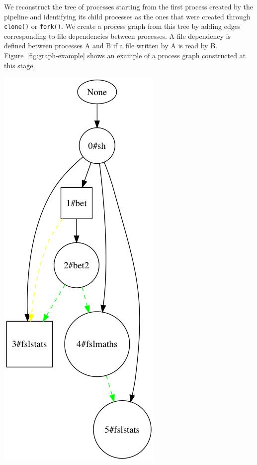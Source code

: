 \documentclass{article}
\begin{document}
We reconstruct the tree of processes starting from the first process
created by the pipeline and identifying its child processes as the ones
that were created through \texttt{clone()} or \texttt{fork()}. We
create a process graph from this tree by adding edges corresponding to
file dependencies between processes. A file dependency is defined
between processes A and B if a file written by A is read by
B. Figure~\ref{fig:graph-example} shows an example of a process graph
constructed at this stage.

\medskip
\noindent
\begin{minipage}[]{.5\linewidth}
  \centering
  \includegraphics[scale=0.2,width=.4\linewidth]{images/simple_graph}
\end{minipage}
\end{document}
